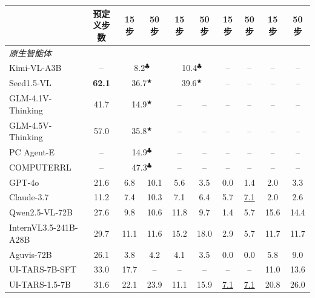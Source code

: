\begin{table}[t]
{\begin{tabular}{@{}c l c cc cc cc cc @{}}
\multicolumn{2}{c}{} & \multicolumn{1}{c}{ {预定义步数}} &  15 步 & 50 步 &  15 步 &  50 步 &  15 步 &  50 步 &  15 步 & 50 步 \\
\midrule
\multicolumn{11}{l}{\textit{原生智能体}} \\
\midrule
\multicolumn{2}{l}{Kimi-VL-A3B~\citeyearpar{kimiteam2025kimivltechnicalreport}}  & -- &  \multicolumn{2}{c}{8.2$^\clubsuit$} & \multicolumn{2}{c}{10.4$^\clubsuit$} & -- & -- & -- & -- \\
\multicolumn{2}{l}{Seed1.5-VL~\citeyearpar{guo2025seed1}} & \textbf{62.1} & \multicolumn{2}{c}{36.7$^\bigstar$} & \multicolumn{2}{c}{39.6$^\bigstar$} & -- & -- & -- & -- \\
\multicolumn{2}{l}{GLM-4.1V-Thinking~\citeyearpar{hong2025glm}}  & 41.7 & \multicolumn{2}{c}{14.9$^\bigstar$} & -- & -- & -- & -- & -- & -- \\
\multicolumn{2}{l}{GLM-4.5V-Thinking~\citeyearpar{hong2025glm}}  & 57.0 & \multicolumn{2}{c}{35.8$^\bigstar$} & -- & -- & -- & -- & -- & -- \\
\multicolumn{2}{l}{PC Agent-E~\citeyearpar{he2025efficientagenttrainingcomputer}}   & -- & \multicolumn{2}{c}{14.9$^\clubsuit$} & -- & -- & -- & -- & -- & -- \\
\multicolumn{2}{l}{COMPUTERRL~\citeyearpar{lai2025computerrl}}   & -- & \multicolumn{2}{c}{47.3$^\clubsuit$} & -- & -- & -- & -- & -- & -- \\
\multicolumn{2}{l}{GPT-4o~\citeyearpar{hurst2024gpt}} & 21.6  & 6.8 & 10.1 & 5.6 & 3.5 & 0.0 & 1.4 & 2.0 & 3.3 \\
\multicolumn{2}{l}{Claude-3.7~\citeyearpar{anthropic2025claude37}}  & 11.2 & 7.4 & 10.3 & 7.1 & 6.4 & 5.7 & \underline{7.1} & 2.0 & 2.6 \\
\multicolumn{2}{l}{Qwen2.5-VL-72B~\citeyearpar{bai2025qwen25vl}}  & 27.6 & 9.8 & 10.6 & 11.8 & 9.7 & 1.4 & 5.7 & 15.6 & 14.4 \\
\multicolumn{2}{l}{InternVL3.5-241B-A28B~\citeyearpar{wang2025internvl35}}  & 29.7 & 11.1 & 11.6 & 15.2 & 18.0 & 2.9 & 5.7 & 11.7 & 11.7 \\
\multicolumn{2}{l}{Aguvis-72B~\citeyearpar{xu2024aguvis} }  & 26.1 & 3.8 & 4.2 & 4.1 & 3.5 & 0.0 & 0.0 & 5.8 & 9.0 \\
\multicolumn{2}{l}{UI-TARS-7B-SFT~\citeyearpar{qin2025uitars}}  & 33.0 & 17.7 & -- & -- & -- & -- & -- & 11.0 & 13.6 \\
\multicolumn{2}{l}{UI-TARS-1.5-7B~\citeyearpar{qin2025uitars} } & 31.6 & 22.1 & 23.9 & 11.1 & 15.9 & \underline{7.1} & \underline{7.1} & 20.8 & 26.0 \\

\end{tabular}}
\end{table}
